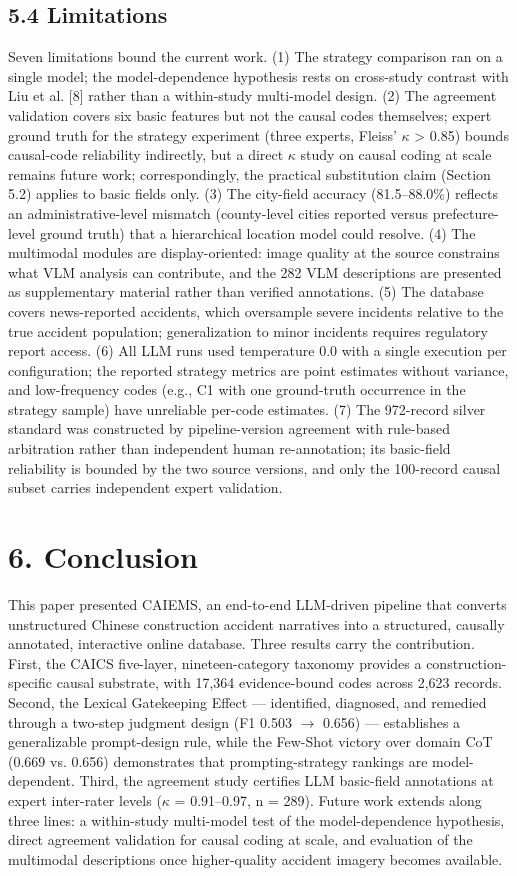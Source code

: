 \documentclass[11pt]{article}
\begin{document}
\subsection{5.4 Limitations}
Seven limitations bound the current work. (1) The strategy comparison ran on a single model; the model-dependence hypothesis rests on cross-study contrast with Liu et al. [8] rather than a within-study multi-model design. (2) The agreement validation covers six basic features but not the causal codes themselves; expert ground truth for the strategy experiment (three experts, Fleiss' $\kappa$ > 0.85) bounds causal-code reliability indirectly, but a direct $\kappa$ study on causal coding at scale remains future work; correspondingly, the practical substitution claim (Section 5.2) applies to basic fields only. (3) The city-field accuracy (81.5--88.0\%) reflects an administrative-level mismatch (county-level cities reported versus prefecture-level ground truth) that a hierarchical location model could resolve. (4) The multimodal modules are display-oriented: image quality at the source constrains what VLM analysis can contribute, and the 282 VLM descriptions are presented as supplementary material rather than verified annotations. (5) The database covers news-reported accidents, which oversample severe incidents relative to the true accident population; generalization to minor incidents requires regulatory report access. (6) All LLM runs used temperature 0.0 with a single execution per configuration; the reported strategy metrics are point estimates without variance, and low-frequency codes (e.g., C1 with one ground-truth occurrence in the strategy sample) have unreliable per-code estimates. (7) The 972-record silver standard was constructed by pipeline-version agreement with rule-based arbitration rather than independent human re-annotation; its basic-field reliability is bounded by the two source versions, and only the 100-record causal subset carries independent expert validation.

\section{6. Conclusion}
This paper presented CAIEMS, an end-to-end LLM-driven pipeline that converts unstructured Chinese construction accident narratives into a structured, causally annotated, interactive online database. Three results carry the contribution. First, the CAICS five-layer, nineteen-category taxonomy provides a construction-specific causal substrate, with 17,364 evidence-bound codes across 2,623 records. Second, the Lexical Gatekeeping Effect --- identified, diagnosed, and remedied through a two-step judgment design (F1 0.503 $\rightarrow$ 0.656) --- establishes a generalizable prompt-design rule, while the Few-Shot victory over domain CoT (0.669 vs. 0.656) demonstrates that prompting-strategy rankings are model-dependent. Third, the agreement study certifies LLM basic-field annotations at expert inter-rater levels ($\kappa$ = 0.91--0.97, n = 289). Future work extends along three lines: a within-study multi-model test of the model-dependence hypothesis, direct agreement validation for causal coding at scale, and evaluation of the multimodal descriptions once higher-quality accident imagery becomes available.
\end{document}
